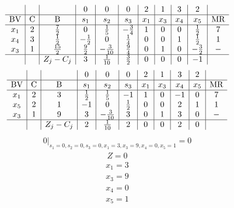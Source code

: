 \documentclass{article}
\begin{document}
\begin{align*}
\begin{array}{c|c|c|c|c|c|c|c|c|c|c}
 &  &  & 0 & 0 & 0 & 2 & 1 & 3 & 2 & \\
\hline
\text{BV} & \text{C} & \text{B} & s_{1} & s_{2} & s_{3} & x_{1} & x_{3} & x_{4} & x_{5} & \text{MR} \\
\hline
x_{1} & 2 & \frac{7}{2} & 0 & \frac{1}{5} & -\frac{3}{4} & 1 & 0 & 0 & \frac{1}{2} & 7 \\
x_{4} & 3 & \frac{1}{2} & -\frac{1}{2} & 0 & \frac{1}{4} & 0 & 0 & 1 & \frac{1}{2} & 1 \\
x_{3} & 1 & \frac{15}{2} & \frac{9}{2} & -\frac{3}{10} & \frac{9}{4} & 0 & 1 & 0 & -\frac{3}{2} & - \\
\hline
 &  & Z_j-C_j & 3 & \frac{1}{10} & \frac{3}{2} & 0 & 0 & 0 & -1 & \\
\end{array}
\end{align*}
\begin{align*}
\begin{array}{c|c|c|c|c|c|c|c|c|c|c}
 &  &  & 0 & 0 & 0 & 2 & 1 & 3 & 2 & \\
\hline
\text{BV} & \text{C} & \text{B} & s_{1} & s_{2} & s_{3} & x_{1} & x_{3} & x_{4} & x_{5} & \text{MR} \\
\hline
x_{1} & 2 & 3 & \frac{1}{2} & \frac{1}{5} & -1 & 1 & 0 & -1 & 0 & 7 \\
x_{5} & 2 & 1 & -1 & 0 & \frac{1}{2} & 0 & 0 & 2 & 1 & 1 \\
x_{3} & 1 & 9 & 3 & -\frac{3}{10} & 3 & 0 & 1 & 3 & 0 & - \\
\hline
 &  & Z_j-C_j & 2 & \frac{1}{10} & 2 & 0 & 0 & 2 & 0 & \\
\end{array}
\end{align*}
\begin{align*}
\left.0\right|_{s_{1}=0,s_{2}=0,s_{3}=0,x_{1}=3,x_{3}=9,x_{4}=0,x_{5}=1}=0\end{align*}
\begin{align*}
Z=0\end{align*}
\begin{align*}
x_{1}=3\end{align*}
\begin{align*}
x_{3}=9\end{align*}
\begin{align*}
x_{4}=0\end{align*}
\begin{align*}
x_{5}=1\end{align*}
\end{document}
